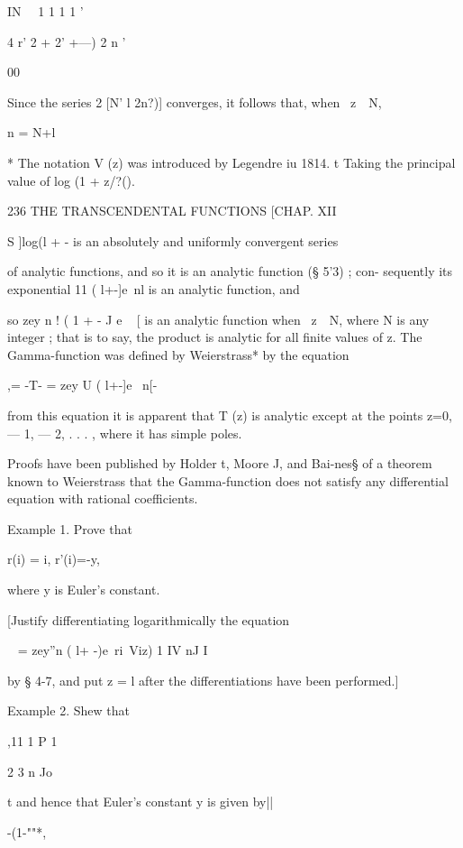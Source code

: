 IN \ \   1 1 1 1 ' 

 4 r' 2 + 2' +---)  2 n ' 

00 

Since the series 2 [N' l 2n?)] converges, it follows that, when \ z\ \   N, 

n = N+l 

* The notation V (z) was introduced by Legendre iu 1814. 
t Taking the principal value of log (1 + z/?(). 



236 THE TRANSCENDENTAL FUNCTIONS [CHAP. XII 

S ]log(l + -   is an absolutely and uniformly convergent series 

of analytic functions, and so it is an analytic function (§ 5'3) ; con- 
sequently its exponential 11  ( l+-]e~nl is an analytic function, and 

so zey  n  ! ( 1 + - J e ~   [ is an analytic function when \ z\ \   N, where N is 
any integer ; that is to say, the product is analytic for all finite values of z. 
The Gamma-function was defined by Weierstrass* by the equation 

,= -T- = zey  U  ( l+-]e ~n[- 

from this equation it is apparent that T (z) is analytic except at the points 
z=0, — 1, — 2, . . . , where it has simple poles. 

Proofs have been published by Holder t, Moore J, and Bai-nes§ of a theorem known to 
Weierstrass that the Gamma-function does not satisfy any differential equation with 
rational coefficients. 

Example 1. Prove that 

r(i) = i, r'(i)=-y, 

where y is Euler's constant. 

[Justify differentiating logarithmically the equation 

~ = zey''n ( l+ -)e~ri\ 
Viz) 1 IV nJ I 

by § 4-7, and put z = l after the differentiations have been performed.] 

Example 2. Shew that 



,11 1 P 1 

2 3 n Jo 



t 
and hence that Euler's constant y is given by|| 



-(1-""*, 



